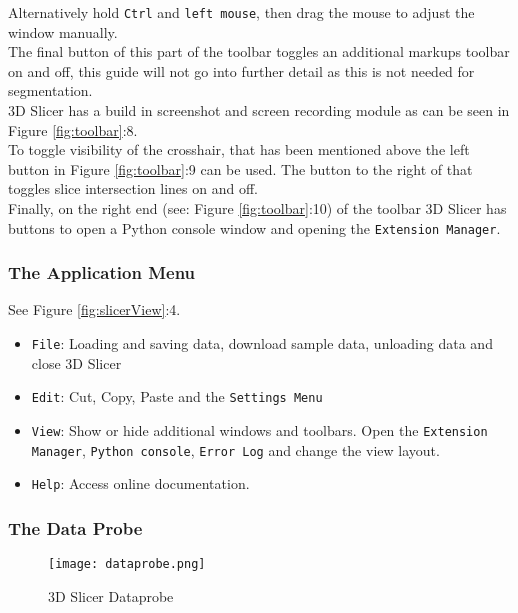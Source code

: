 Alternatively hold \texttt{Ctrl} and \texttt{left mouse}, then drag the mouse to adjust the window manually.\\
The final button of this part of the toolbar toggles an additional markups toolbar on and off, this guide will not go into further detail as this is not needed for segmentation.\\
3D Slicer has a build in screenshot and screen recording module as can be seen in Figure \ref{fig:toolbar}:8.\\
To toggle visibility of the crosshair, that has been mentioned above the left button in Figure \ref{fig:toolbar}:9 can be used. The button to the right of that toggles slice intersection lines on and off.\\
Finally, on the right end (see: Figure \ref{fig:toolbar}:10) of the toolbar 3D Slicer has buttons to open a Python console window and opening the \texttt{Extension Manager}.

\subsubsection{The Application Menu}
See Figure \ref{fig:slicerView}:4. %
\begin{itemize}
	\item \texttt{File}: Loading and saving data, download sample data, unloading data and close 3D Slicer
	\item \texttt{Edit}: Cut, Copy, Paste and the \texttt{Settings Menu}
	\item \texttt{View}: Show or hide additional windows and toolbars. Open the \texttt{Extension Manager}, \texttt{Python console}, \texttt{Error Log} and change the view layout.
	\item \texttt{Help}: Access online documentation.
\end{itemize}

\subsubsection{The Data Probe}
\begin{figure}[h!] %
	\centerline{ %
		\texttt{[image: dataprobe.png]}}
	\caption{3D Slicer Dataprobe}\label{fig:dataprobe}
\end{figure}

